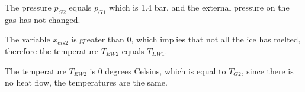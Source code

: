 The pressure \( p_{G2} \) equals \( p_{G1} \) which is 1.4 bar, and the external pressure on the gas has not changed.

The variable \( x_{eis2} \) is greater than 0, which implies that not all the ice has melted, therefore the temperature \( T_{EW2} \) equals \( T_{EW1} \).

The temperature \( T_{EW2} \) is 0 degrees Celsius, which is equal to \( T_{G2} \), since there is no heat flow, the temperatures are the same.